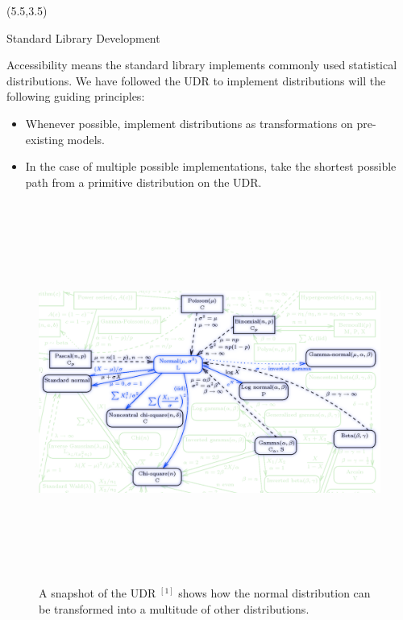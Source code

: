 \documentclass[22pt]{beamer}
\begin{document}
\begin{frame}[fragile]
\begin{textblock}{5}
\begin{textblock}{5}(5.5,3.5)





\begin{block}{\Large{Standard Library Development}}
\justifying

\footnotesize{Accessibility means the standard library implements commonly used statistical distributions. We have followed the UDR to implement distributions will the following guiding principles:


\footnotesize{

\bigskip
\begin{itemize}
  \item Whenever possible, implement distributions as transformations on pre-existing models.
  \item In the case of multiple possible implementations, take the shortest possible path from a primitive distribution on the UDR.
\end{itemize}
        }
}

\bigskip

\begin{figure}
\centering
\includegraphics[height=12.5cm]{UDR.png}
\caption{\tiny{A snapshot of the UDR $^{[1]}$ shows how the normal distribution can be transformed into a multitude of other distributions.}}
\end{figure}


\end{block}
\end{textblock}
\end{textblock}
\end{frame}
\end{document}
